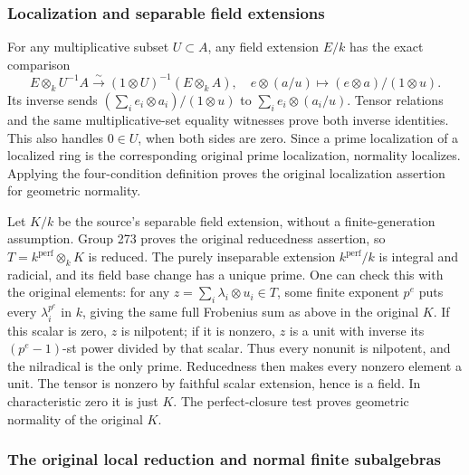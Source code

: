 \subsubsection{Localization and separable field extensions}\label{algebra-proof-070-localization-and-separable-field-extensions}

For any multiplicative subset \(U\subset A\), any field extension \(E/k\) has the exact comparison \[
 E\otimes_kU^{-1}A\xrightarrow{\sim}(1\otimes U)^{-1}(E\otimes_kA),
 \quad e\otimes(a/u)\longmapsto(e\otimes a)/(1\otimes u).
\] Its inverse sends \((\sum_i e_i\otimes a_i)/(1\otimes u)\) to \(\sum_i e_i\otimes(a_i/u)\). Tensor relations and the same multiplicative-set equality witnesses prove both inverse identities. This also handles \(0\in U\), when both sides are zero. Since a prime localization of a localized ring is the corresponding original prime localization, normality localizes. Applying the four-condition definition proves the original localization assertion for geometric normality.

Let \(K/k\) be the source's separable field extension, without a finite-generation assumption. Group 273 proves the original reducedness assertion, so \(T=k^{\mathrm{perf}}\otimes_kK\) is reduced. The purely inseparable extension \(k^{\mathrm{perf}}/k\) is integral and radicial, and its field base change has a unique prime. One can check this with the original elements: for any \(z=\sum_i\lambda_i\otimes u_i\in T\), some finite exponent \(p^e\) puts every \(\lambda_i^{p^e}\) in \(k\), giving the same full Frobenius sum as above in the original \(K\). If this scalar is zero, \(z\) is nilpotent; if it is nonzero, \(z\) is a unit with inverse its \((p^e-1)\)-st power divided by that scalar. Thus every nonunit is nilpotent, and the nilradical is the only prime. Reducedness then makes every nonzero element a unit. The tensor is nonzero by faithful scalar extension, hence is a field. In characteristic zero it is just \(K\). The perfect-closure test proves geometric normality of the original \(K\).

\subsubsection{The original local reduction and normal finite subalgebras}\label{algebra-proof-070-the-original-local-reduction-and-normal-finite-subalgebras}

